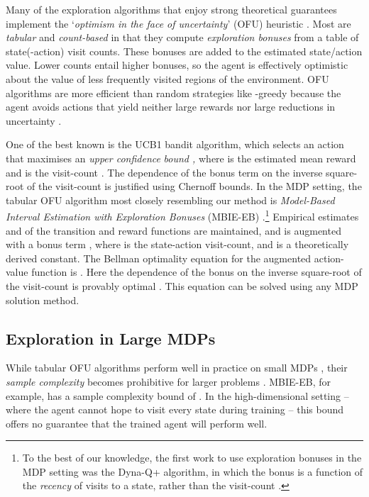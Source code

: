 \documentclass{article}
\theoremstyle{definition}
\theoremstyle{definition}
\theoremstyle{plain}
\theoremstyle{plain}
\theoremstyle{plain}
\begin{document}
Many of the exploration algorithms that enjoy strong theoretical guarantees
implement the `\emph{optimism in the face of uncertainty}' (OFU) heuristic
\cite{Strehl2009}. Most are \emph{tabular }and \emph{count-based}
in that they compute \emph{exploration bonuses} from a table of state(-action)
visit counts. These bonuses are added to the estimated state/action
value. Lower counts entail higher bonuses, so the agent is effectively
optimistic about the value of less frequently visited regions of the
environment. OFU algorithms are more efficient than random strategies
like -greedy because the agent avoids actions that yield
neither large rewards nor large reductions in uncertainty \cite{Osband2016a}. 

One of the best known is the UCB1 bandit algorithm, which selects
an action  that maximises an \emph{upper confidence} \emph{bound
, }where 
is the estimated mean reward and  is the visit-count \cite{LR:1985bandits}.
The dependence of the bonus term on the inverse square-root of the
visit-count is justified using Chernoff bounds. In the MDP setting,
the tabular OFU algorithm most closely resembling our method is \emph{Model-Based
Interval Estimation with Exploration Bonuses} (MBIE-EB) \cite{Strehl2008}.\footnote{To the best of our knowledge, the first work to use exploration bonuses
in the MDP setting was the Dyna-Q+ algorithm, in which the bonus is
a function of the \emph{recency }of visits to a state, rather than
the visit-count \cite{Sutton:1990:IAL:101883.102055}.}\emph{ }Empirical estimates  and 
of the transition and reward functions are maintained, and 
is augmented with a bonus term , where
 is the state-action visit-count, and 
is a theoretically derived constant. The Bellman optimality equation
for the augmented action-value function is .
Here the dependence of the bonus on the inverse square-root of the
visit-count is provably optimal \cite{Kolter2009}. This equation
can be solved using any MDP solution method. 


\subsection{Exploration in Large MDPs\label{sub:BellemarePseudo}}

While tabular OFU algorithms perform well in practice on small MDPs
\cite{1374179}, their\emph{ sample complexity} becomes prohibitive
for larger problems \cite{Kakade:2003}. MBIE-EB, for example, has
a sample complexity bound of .
In the high-dimensional setting -- where the agent cannot hope to
visit every state during training -- this bound offers no guarantee
that the trained agent will perform well. 
\end{document}
